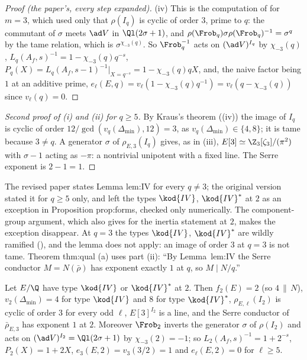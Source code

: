 \begin{proof}[Proof (the paper's, every step expanded)]
(iv) This is the computation of  for $m=3$, which used only that $\rho(I_q)$ is cyclic of order $3$, prime to $q$: the
commutant of $\sigma$ meets $\ad V$ in $\Ql(2\sigma+1)$, and $\rho(\Frob_q)\sigma\rho(\Frob_q)^{-1}=\sigma^q$ by the tame relation, which is $\sigma^{\chi_{-3}(q)}$. So $\Frob_q^{-1}$
acts on $(\ad V)^{I_q}$ by $\chi_{-3}(q)$, $L_q(A_f,s)^{-1}=1-\chi_{-3}(q)q^{-s}$, $P_q(X)=L_q(A_f,s-1)^{-1}|_{X=q^{-s}}=1-\chi_{-3}(q)qX$, and, the naive factor being $1$ at an
additive prime, $e_\ell(E,q)=v_\ell(1-\chi_{-3}(q)q^{-1})=v_\ell(q-\chi_{-3}(q))$ since $v_\ell(q)=0$.
\end{proof}

\begin{proof}[Second proof of (i) and (ii) for $q\ge5$]
By Kraus's theorem ((iv)) the image of $I_q$ is cyclic of order $12/\gcd(v_q(\Delta_{\min}),12)=3$, as $v_q(\Delta_{\min})\in\{4,8\}$; it is
tame because $3\ne q$. A generator $\sigma$ of $\rho_{E,3}(I_q)$ gives, as in (iii), $E[3]\simeq\Z_3[\zeta_3]/(\pi^2)$ with $\sigma-1$ acting as $-\pi$: a nontrivial unipotent
with a fixed line. The Serre exponent is $2-1=1$.
\end{proof}

\begin{paperlink}
The revised paper states Lemma lem:IV for every $q\ne3$; the original version stated it for $q\ge5$ only, and left the
types $\kod{IV}$, $\kod{IV}^*$ at $2$ as an exception in Proposition prop:forms, checked only numerically. The component-group argument, which
 also gives for the inertia statement at $2$, makes the exception disappear. At $q=3$ the types $\kod{IV}$, $\kod{IV}^*$ are
wildly ramified (), and the lemma does not apply: an image of order $3$ at $q=3$ is not tame. Theorem thm:qual (a) uses
part (ii): ``By Lemma~lem:IV the Serre conductor $M=N(\bar\rho)$ has exponent exactly $1$ at $q$, so $M\mid N/q$.''
\end{paperlink}

\begin{corollary}\label{cor:galrep:IV-at-2}
Let $E/\Q$ have type $\kod{IV}$ or $\kod{IV}^*$ at $2$. Then $f_2(E)=2$ (so $4\,\|\,N$), $v_2(\Delta_{\min})=4$ for type $\kod{IV}$ and $8$ for type $\kod{IV}^*$, $\rho_{E,\ell}(I_2)$ is
cyclic of order $3$ for every odd $\ell$, $E[3]^{I_2}$ is a line, and the Serre conductor of $\bar\rho_{E,3}$ has exponent $1$ at $2$. Moreover $\Frob_2$ inverts
the generator $\sigma$ of $\rho(I_2)$ and acts on $(\ad V)^{I_2}=\Ql(2\sigma+1)$ by $\chi_{-3}(2)=-1$; so $L_2(A_f,s)^{-1}=1+2^{-s}$, $P_2(X)=1+2X$, $e_3(E,2)=v_3(3/2)=1$
and $e_\ell(E,2)=0$ for $\ell\ge5$.
\end{corollary}


